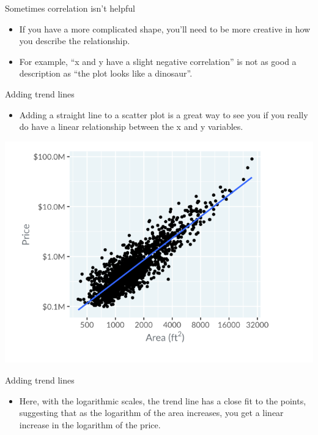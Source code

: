 \documentclass[
  ignorenonframetext,
]{beamer}
\providecommand{\tightlist}{%
  \setlength{\itemsep}{0pt}\setlength{\parskip}{0pt}}
\begin{document}
\begin{frame}{Sometimes correlation isn't helpful}
\label{sometimes-correlation-isnt-helpful-2}
\begin{itemize}
\item
  If you have a more complicated shape, you'll need to be more creative
  in how you describe the relationship.
\item
  For example, ``x and y have a slight negative correlation'' is not as
  good a description as ``the plot looks like a dinosaur''.
\end{itemize}
\end{frame}

\begin{frame}{Adding trend lines}
\label{adding-trend-lines}
\begin{itemize}
\tightlist
\item
  Adding a straight line to a scatter plot is a great way to see you if
  you really do have a linear relationship between the x and y
  variables.
\end{itemize}

\includegraphics{../images/im36.png}
\end{frame}

\begin{frame}{Adding trend lines}
\label{adding-trend-lines-1}
\begin{itemize}
\tightlist
\item
  Here, with the logarithmic scales, the trend line has a close fit to
  the points, suggesting that as the logarithm of the area increases,
  you get a linear increase in the logarithm of the price.
\end{itemize}
\end{frame}
\end{document}
